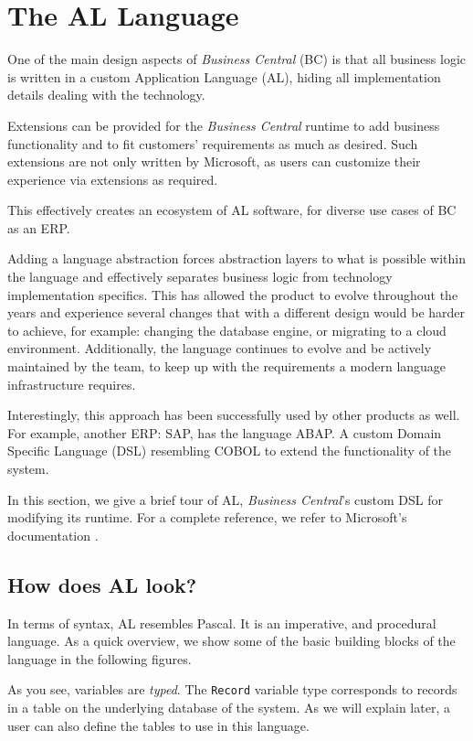 \chapter{The AL Language}
\label{sec:appendix-allang}

One of the main design aspects of \emph{Business Central} (BC) is that all business logic is written in 
a custom Application Language (AL), hiding all implementation details dealing with the technology.

Extensions can be provided for the \emph{Business Central} runtime to add business functionality
and to fit customers' requirements as much as desired. Such extensions are not only written by
Microsoft, as users can customize their experience via extensions as required.

This effectively creates an ecosystem of AL software, for diverse use cases of BC as an ERP.

Adding a language abstraction forces abstraction layers to what is possible within the language
and effectively separates business logic from technology implementation specifics.
This has allowed the product to evolve throughout the years and experience several changes 
that with a different design would be harder to achieve, for example: changing the 
database engine, or migrating to a cloud environment. Additionally, the language continues
to evolve and be actively maintained by the team, to keep up with the requirements
a modern language infrastructure requires.

Interestingly, this approach has been successfully used by other products as well. For example,
another ERP: SAP, has the language ABAP. A custom Domain Specific Language (DSL) resembling COBOL
to extend the functionality of the system.

In this section, we give a brief tour of AL, \emph{Business Central}'s custom DSL for modifying
its runtime. For a complete reference, we refer to Microsoft's documentation \cite{bcaldocs}.

\section{How does AL look?}

In terms of syntax, AL resembles Pascal. It is an imperative, and procedural language. 
As a quick overview, we show some of the basic building blocks of the language
in the following figures.

As you see, variables are \emph{typed}. The \texttt{Record} variable type corresponds to
records in a table on the underlying database of the system. As we will explain later,
a user can also define the tables to use in this language.

